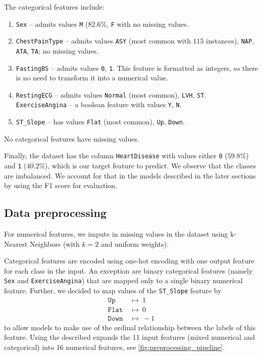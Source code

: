 The categorical features include:
\begin{enumerate}
    \item \texttt{Sex} -- admits values \texttt{M} ($82.6\%$, \texttt{F} with no missing values.
    \item \texttt{ChestPainType} -- admits values \texttt{ASY} (most common with $115$ instances), \texttt{NAP}, \texttt{ATA}, \texttt{TA}; no missing values.
    \item \texttt{FastingBS} -- admits values \texttt{0}, \texttt{1}. This feature is formatted as integers, so there is no need to transform it into a numerical value.
    \item \texttt{RestingECG} -- admits values \texttt{Normal} (most common), \texttt{LVH}, \texttt{ST}.
    \texttt{ExerciseAngina} -- a boolean feature with values \texttt{Y}, \texttt{N}.
    \item \texttt{ST\_Slope} -- has values \texttt{Flat} (most common), \texttt{Up}, \texttt{Down}.
\end{enumerate}
No categorical features have missing values.

Finally, the dataset has the column \texttt{HeartDisease} with values either \texttt{0} ($59.8\%$) and \texttt{1} ($40.2\%$), which is our target feature to predict. We observe that the classes are imbalanced. We account for that in the models described in the later sections by using the F1 score for evaluation.

\subsection{Data preprocessing}

For numerical features, we impute in missing values in the dataset using k-Nearest Neighbors (with $k=2$ and uniform weights).

Categorical features are encoded using one-hot encoding with one output feature for each class in the input. An exception are binary categorical features (namely \texttt{Sex} and \texttt{ExerciseAngina}) that are mapped only to a single binary numerical feature. Further, we decided to map values of the \texttt{ST\_Slope} feature by
\begin{align*}
\texttt{Up}\ &\mapsto\ 1\\
\texttt{Flat}\ &\mapsto\ 0\\
\texttt{Down}\ &\mapsto\ -1
\end{align*}
to allow models to make use of the ordinal relationship between the labels of this feature.
Using the described expands the 11 input features (mixed numerical and categorical) into 16 numerical features, see \autoref{fig:preprocessing_pipeline}.

